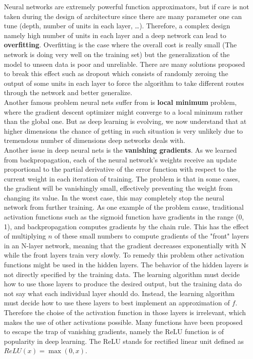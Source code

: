 Neural networks are extremely powerful function approximators, but if care is not taken during the design of architecture since there are many parameter one can tune (depth, number of units in each layer, \ldots). Therefore, a complex design namely high number of units in each layer and a deep network can lead to \textbf{overfitting}. Overfitting is the case where the overall cost is really small (The network is doing very well on the training set) but the generalization of the model to unseen data is poor and unreliable. There are many solutions proposed to break this effect such as dropout which consists of randomly zeroing the output of some units in each layer to force the algorithm to take different routes through the network and better generalize. \\
Another famous problem neural nets suffer from is \textbf{local minimum} problem, where the gradient descent optimizer might converge to a local minimum rather than the global one. But as deep learning is evolving, we now understand that at higher dimensions the chance of getting in such situation is very unlikely due to tremendous number of dimensions deep networks deals with. \\
Another issue in deep neural nets is the \textbf{vanishing gradients}. As we learned from backpropagation, each of the neural network's weights receive an update proportional to the partial derivative of the error function with respect to the current weight in each iteration of training. The problem is that in some cases, the gradient will be vanishingly small, effectively preventing the weight from changing its value. In the worst case, this may completely stop the neural network from further training. As one example of the problem cause, traditional activation functions such as the sigmoid function have gradients in the range (0, 1), and backpropagation computes gradients by the chain rule. This has the effect of multiplying $n$ of these small numbers to compute gradients of the "front" layers in an N-layer network, meaning that the gradient decreases exponentially with N while the front layers train very slowly.
To remedy this problem other activation functions might be used in the hidden layers. The behavior of the hidden layers is not directly
specified by the training data. The learning algorithm must decide how to use those layers to produce the desired output, but the training data do not say what each individual layer should do. Instead, the learning algorithm must decide how to use these layers to best implement an approximation of $f$. Therefore the choise of the activation function in those layers is irrelevant, which makes the use of other activations possible. Many functions have been proposed to escape the trap of vanishing gradients, namely the ReLU function is of popularity in deep learning. The ReLU stands for rectified linear unit defined as $ReLU(x) = \max (0, x)$.

